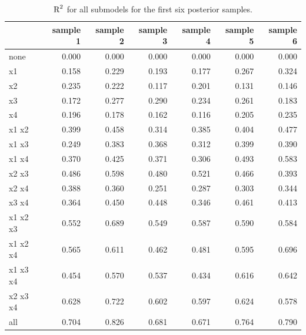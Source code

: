 \documentclass[11pt,a4paper,twoside]{book}
\newenvironment{knitrout}{}{} %
\begin{document}
\begin{knitrout}
\color{fgcolor}\begin{table}

\caption{\label{tab:simdata.postsample3}$ \text{R}^2$ for all submodels for the first six posterior samples.}
\centering
\begin{tabular}[t]{lrrrrrr}
\toprule
  & sample 1 & sample 2 & sample 3 & sample 4 & sample 5 & sample 6\\
\midrule
none & 0.000 & 0.000 & 0.000 & 0.000 & 0.000 & 0.000\\
x1 & 0.158 & 0.229 & 0.193 & 0.177 & 0.267 & 0.324\\
x2 & 0.235 & 0.222 & 0.117 & 0.201 & 0.131 & 0.146\\
x3 & 0.172 & 0.277 & 0.290 & 0.234 & 0.261 & 0.183\\
x4 & 0.196 & 0.178 & 0.162 & 0.116 & 0.205 & 0.235\\
x1 x2 & 0.399 & 0.458 & 0.314 & 0.385 & 0.404 & 0.477\\
x1 x3 & 0.249 & 0.383 & 0.368 & 0.312 & 0.399 & 0.390\\
x1 x4 & 0.370 & 0.425 & 0.371 & 0.306 & 0.493 & 0.583\\
x2 x3 & 0.486 & 0.598 & 0.480 & 0.521 & 0.466 & 0.393\\
x2 x4 & 0.388 & 0.360 & 0.251 & 0.287 & 0.303 & 0.344\\
x3 x4 & 0.364 & 0.450 & 0.448 & 0.346 & 0.461 & 0.413\\
x1 x2 x3 & 0.552 & 0.689 & 0.549 & 0.587 & 0.590 & 0.584\\
x1 x2 x4 & 0.565 & 0.611 & 0.462 & 0.481 & 0.595 & 0.696\\
x1 x3 x4 & 0.454 & 0.570 & 0.537 & 0.434 & 0.616 & 0.642\\
x2 x3 x4 & 0.628 & 0.722 & 0.602 & 0.597 & 0.624 & 0.578\\
all & 0.704 & 0.826 & 0.681 & 0.671 & 0.764 & 0.790\\
\bottomrule
\end{tabular}
\end{table}


\end{knitrout}
\end{document}
